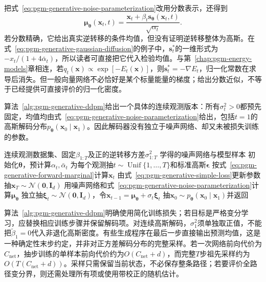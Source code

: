 把式~\eqref{eq:pgm-generative-noise-parameterization}改用分数表示，还得到
\[
  \bm{\mu}_{\bm{\theta}}(\bm{x}_t,t)
    =\frac{\bm{x}_t+\beta_t\bm{s}_{\bm{\theta}}(\bm{x}_t,t)}
            {\sqrt{\alpha_t}}.
\]
若分数精确，它给出真实逆转移的条件均值，但没有证明逆转移整体为高斯。在式~\eqref{eq:pgm-generative-gaussian-diffusion}的例子中，$\bm{s}_t^*$的一维形式为$-x_t/(1+4\bar{\alpha}_t)$，所以读者可直接把它代入检验均值。与第~\ref{chap:pgm-energy-models}章相连，若$q_t(\bm{x})\propto\exp[-E_t(\bm{x})]$，则$\bm{s}_t^*=-\nabla E_t$，归一化常数在求导后消失。但一般向量网络不必恰好是某个标量能量的梯度；给出分数近似，不等于已经提供可直接评价的归一化密度。

算法~\ref{alg:pgm-generative-ddpm}给出一个具体的连续观测版本：所有$\sigma_t^2>0$都预先固定，均值均由式~\eqref{eq:pgm-generative-noise-parameterization}给出，包括$t=1$的高斯解码分布$p_{\bm{\theta}}(\bm{x}_0\mid\bm{x}_1)$。因此解码器没有独立于噪声网络、却又未被损失训练的参数。

\begin{algorithm}[固定方差DDPM的学习与祖先采样]
  \label{alg:pgm-generative-ddpm}
  \begin{algorithmic}[1]
    \Require 连续观测数据集、固定$\beta_{1:T}$及正的逆转移方差$\sigma_{1:T}^2$
    \Ensure 学得的噪声网络与模型样本
    \State 初始化$\bm{\theta}$，预计算$\alpha_t,\bar{\alpha}_t$
      \State 为每个观测抽$t\sim\operatorname{Unif}\{1,\ldots,T\}$和标准高斯$\bm{\epsilon}$
      \State 按式~\eqref{eq:pgm-generative-forward-marginal}计算$\bm{x}_t$
      \State 由式~\eqref{eq:pgm-generative-simple-loss}更新参数
    \EndFor
    \State 抽$\bm{x}_T\sim\mathcal{N}(\bm{0},\bm{I}_d)$
      \State 用噪声网络和式~\eqref{eq:pgm-generative-noise-parameterization}计算$\bm{\mu}_{\bm{\theta}}$
      \State 独立抽$\bm{\xi}_t\sim\mathcal{N}(\bm{0},\bm{I}_d)$，令$\bm{x}_{t-1}=\bm{\mu}_{\bm{\theta}}+\sigma_t\bm{\xi}_t$
    \EndFor
    \State 抽$\bm{x}_0\sim p_{\bm{\theta}}(\bm{x}_0\mid\bm{x}_1)$并返回
  \end{algorithmic}
\end{algorithm}

算法~\ref{alg:pgm-generative-ddpm}明确使用简化训练损失；若目标是严格变分学习，应替换相应训练步骤并保留解码项。对连续高斯解码，$\sigma_1^2$须单独取正值，不能把$\widetilde{\beta}_1=0$代入非退化高斯密度。有些生成程序在最后一步直接输出预测均值，这是一种确定性末步约定，并非对正方差解码分布的完整采样。若一次网络前向代价为$C_{\mathrm{net}}$，抽步训练的单样本前向代价约为$O(C_{\mathrm{net}}+d)$，而完整$T$步祖先采样约为$O(T(C_{\mathrm{net}}+d))$。采样只需保留当前状态，不必保存整条路径；若要评价全路径变分界，则还需处理所有项或使用带校正的随机估计。

